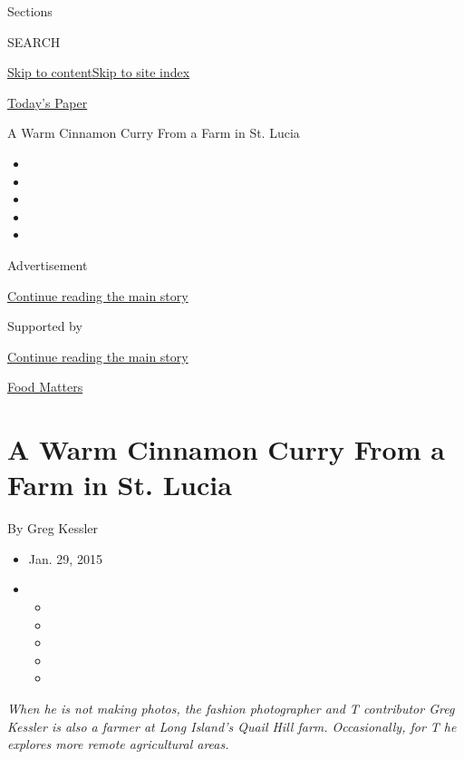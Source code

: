 Sections

SEARCH

\protect\hyperlink{site-content}{Skip to
content}\protect\hyperlink{site-index}{Skip to site index}

\href{https://myaccount.nytimes3xbfgragh.onion/auth/login?response_type=cookie\&client_id=vi}{}

\href{https://www.nytimes3xbfgragh.onion/section/todayspaper}{Today's
Paper}

A Warm Cinnamon Curry From a Farm in St. Lucia

\begin{itemize}
\item
\item
\item
\item
\item
\end{itemize}

Advertisement

\protect\hyperlink{after-top}{Continue reading the main story}

Supported by

\protect\hyperlink{after-sponsor}{Continue reading the main story}

\href{/column/food-matters}{Food Matters}

\hypertarget{a-warm-cinnamon-curry-from-a-farm-in-st-lucia}{%
\section{A Warm Cinnamon Curry From a Farm in St.
Lucia}\label{a-warm-cinnamon-curry-from-a-farm-in-st-lucia}}

By Greg Kessler

\begin{itemize}
\item
  Jan. 29, 2015
\item
  \begin{itemize}
  \item
  \item
  \item
  \item
  \item
  \end{itemize}
\end{itemize}

\emph{When he is not making photos, the fashion photographer and T
contributor Greg Kessler is also a farmer at Long Island's Quail Hill
farm. Occasionally, for T he explores more remote agricultural areas.}

